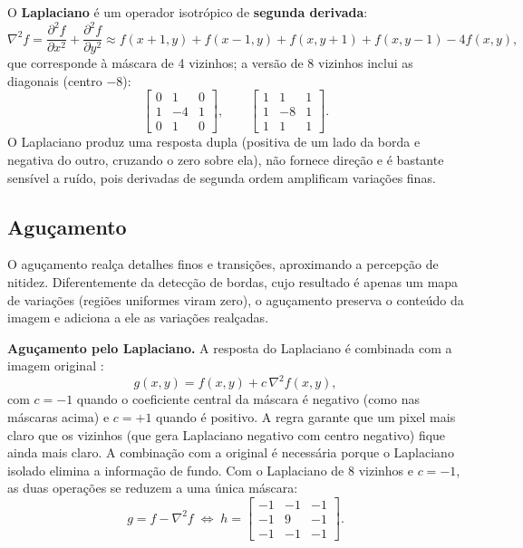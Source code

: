 \documentclass[11pt,a4paper]{article}
\begin{document}
O \textbf{Laplaciano} é um operador isotrópico de \textbf{segunda derivada}:
\begin{equation}
  \nabla^2 f = \frac{\partial^2 f}{\partial x^2} + \frac{\partial^2 f}{\partial y^2}
  \approx f(x{+}1,y) + f(x{-}1,y) + f(x,y{+}1) + f(x,y{-}1) - 4f(x,y),
\end{equation}
que corresponde à máscara de 4 vizinhos; a versão de 8 vizinhos inclui as diagonais
(centro $-8$):
\begin{equation}
  \begin{bmatrix} 0 & 1 & 0 \\ 1 & -4 & 1 \\ 0 & 1 & 0 \end{bmatrix}, \qquad
  \begin{bmatrix} 1 & 1 & 1 \\ 1 & -8 & 1 \\ 1 & 1 & 1 \end{bmatrix}.
\end{equation}
O Laplaciano produz uma resposta dupla (positiva de um lado da borda e negativa do outro,
cruzando o zero sobre ela), não fornece direção e é bastante sensível a ruído, pois
derivadas de segunda ordem amplificam variações finas.

\subsection{Aguçamento}

O aguçamento realça detalhes finos e transições, aproximando a percepção de nitidez.
Diferentemente da detecção de bordas, cujo resultado é apenas um mapa de variações (regiões
uniformes viram zero), o aguçamento preserva o conteúdo da imagem e adiciona a ele as
variações realçadas.

\textbf{Aguçamento pelo Laplaciano.} A resposta do Laplaciano é combinada com a imagem
original \cite{gonzalez}:
\begin{equation}
  g(x, y) = f(x, y) + c\, \nabla^2 f(x, y),
\end{equation}
com $c = -1$ quando o coeficiente central da máscara é negativo (como nas máscaras acima) e
$c = +1$ quando é positivo. A regra garante que um pixel mais claro que os vizinhos (que gera
Laplaciano negativo com centro negativo) fique ainda mais claro. A combinação com a
original é necessária porque o Laplaciano isolado elimina a informação de fundo. Com o
Laplaciano de 8 vizinhos e $c = -1$, as duas operações se reduzem a uma única máscara:
\begin{equation}
  g = f - \nabla^2 f \;\Longleftrightarrow\;
  h = \begin{bmatrix} -1 & -1 & -1 \\ -1 & 9 & -1 \\ -1 & -1 & -1 \end{bmatrix}.
\end{equation}
\end{document}
